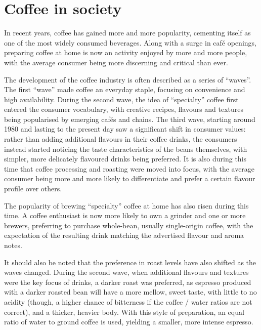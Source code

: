 \section{Coffee in society}
\label{sec:coffee-in-society} In recent years, coffee has gained more and more popularity,
cementing itself as one of the most widely consumed beverages. Along with a surge
in café openings, preparing coffee at home is now an activity enjoyed by more
and more people, with the average consumer being more discerning and critical than
ever.

The development of the coffee industry is often described as a series of ``waves''.
The first ``wave'' made coffee an everyday staple, focusing on convenience and high
availability. During the second wave, the idea of ``specialty'' coffee first entered
the consumer vocabulary, with creative recipes, flavours and textures being popularised
by emerging cafés and chains. The third wave, starting around 1980 and lasting to
the present day saw a significant shift in consumer values: rather than adding
additional flavours in their coffee drinks, the consumers instead started noticing
the taste characteristics of the beans themselves, with simpler, more delicately
flavoured drinks being preferred. It is also during this time that coffee
processing and roasting were moved into focus, with the average consumer being more
and more likely to differentiate and prefer a certain flavour profile over others.

The popularity of brewing ``specialty'' coffee at home has also risen during this
time. A coffee enthusiast is now more likely to own a grinder and one or more
brewers, preferring to purchase whole-bean, usually single-origin coffee, with the
expectation of the resulting drink matching the advertised flavour and aroma notes.

It should also be noted that the preference in roast levels have also shifted as
the waves changed. During the second wave, when additional flavours and textures
were the key focus of drinks, a darker roast was preferred, as espresso produced
with a darker roasted bean will have a more mellow, sweet taste, with little to no
acidity (though, a higher chance of bitterness if the coffee / water ratios are not
correct), and a thicker, heavier body. With this style of preparation, an equal
ratio of water to ground coffee is used, yielding a smaller, more intense
espresso.

